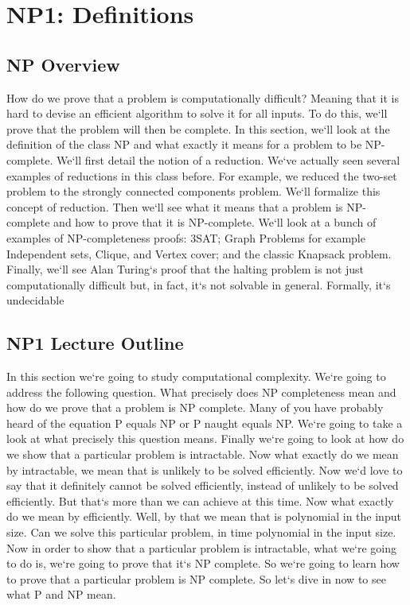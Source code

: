 \section{NP1: Definitions}

\subsection{NP  Overview}
How do we prove that a problem is computationally difficult? Meaning that it is hard to devise an efficient algorithm to solve it for all inputs.
To do this, we`ll prove that the problem will then be complete.
In this section, we`ll look at the definition of the class NP and what exactly it means for a problem to be NP-complete.
We`ll first detail the notion of a reduction.
We`ve actually seen several examples of reductions in this class before.
For example, we reduced the two-set problem to the strongly connected components problem.
We`ll formalize this concept of reduction.
Then we`ll see what it means that a problem is NP-complete and how to prove that it is NP-complete.
We`ll look at a bunch of examples of NP-completeness proofs: 3SAT; Graph Problems for example Independent sets, Clique, and Vertex cover; and the classic Knapsack problem.
Finally, we`ll see Alan Turing`s proof that the halting problem is not just computationally difficult but, in fact, it`s not solvable in general.
Formally, it`s undecidable

\subsection{NP1  Lecture Outline}
In this section we`re going to study computational complexity.
We`re going to address the following question.
What precisely does NP completeness mean and how do we prove that a problem is NP complete.
Many of you have probably heard of the equation P equals NP or P naught equals NP\@.
We`re going to take a look at what precisely this question means.
Finally we`re going to look at how do we show that a particular problem is intractable.
Now what exactly do we mean by intractable, we mean that is unlikely to be solved efficiently.
Now we`d love to say that it definitely cannot be solved efficiently, instead of unlikely to be solved efficiently.
But that`s more than we can achieve at this time.
Now what exactly do we mean by efficiently.
Well, by that we mean that is polynomial in the input size.
Can we solve this particular problem, in time polynomial in the input size.
Now in order to show that a particular problem is intractable, what we`re going to do is, we`re going to prove that it`s NP complete.
So we`re going to learn how to prove that a particular problem is NP complete.
So let`s dive in now to see what P and NP mean.

